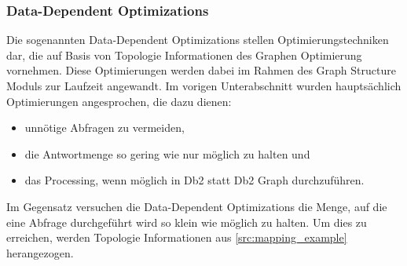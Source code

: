 \subsubsection{Data-Dependent Optimizations}
\label{subsubsec:data_dependent_optimizations}

Die sogenannten Data-Dependent Optimizations stellen Optimierungstechniken dar, die auf Basis von Topologie Informationen des Graphen Optimierung vornehm\-en. Diese Optimierungen werden dabei im Rahmen des Graph Structure Moduls zur Laufzeit angewandt. Im vorigen Unterabschnitt  wurden hauptsächlich Optimierungen angesprochen, die dazu dienen:
\begin{itemize}
    \item unnötige Abfragen zu vermeiden, 
    \item die Antwortmenge so gering wie nur möglich zu halten und 
    \item das Processing, wenn möglich in Db2 statt Db2 Graph durchzuführen.  
\end{itemize}
Im Gegensatz versuchen die Data-Dependent Optimizations die Menge, auf die eine Abfrage durchgeführt wird so klein wie möglich zu halten. Um dies zu erreichen, werden Topologie Informationen aus \autoref{src:mapping_example} herangezogen.


